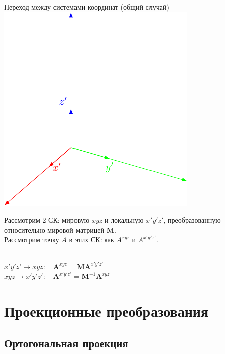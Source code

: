 \documentclass[10pt]{beamer}
\begin{document}
\begin{frame}{Переход между системами координат (общий случай)}
	{
		\includegraphics[page=7]{coordsystems.pdf}
	}
	{
		Рассмотрим 2 СК: мировую $xyz$ и локальную $x'y'z'$, преобразованную относительно мировой матрицей $\mathbf M$. \\[0.5em]
		
		Рассмотрим точку $A$ в этих СК: как $A^{xyz}$ и $A^{x'y'z'}$. \\ ~ \\
		
		\pause
		
		$x'y'z' \rightarrow  xyz: \quad  \mathbf A^{xyz}=\mathbf{M}\mathbf A^{x'y'z'}$ \\[0.5em]
		$xyz \rightarrow  x'y'z': \quad  \mathbf A^{x'y'z'}=\mathbf{M}^{-1}\mathbf A^{xyz}$
		
				
		 
	}
\end{frame}
  

  
  
  \section{Проекционные преобразования}
  \frame{\sectionpage}
  
  
  \subsection{Ортогональная проекция}
  
\end{document}
